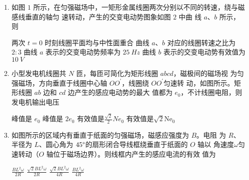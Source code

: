 \begin{enumerate}
\item 
{}
如图 $ 1 $ 所示，在匀强磁场中，一矩形金属线圈两次分别以不同的转速，绕与磁感线垂直的轴匀
速转动，产生的交变电动势图象如图 $ 2 $ 中曲
线 $ a $、$ b $ 所示，则  
\begin{figure}[h!]
\centering
\begin{subfigure}{0.4\linewidth}
\centering
 
\caption{}\label{}
\end{subfigure}
\begin{subfigure}{0.4\linewidth}
\centering
 
\caption{}\label{}
\end{subfigure}
\end{figure}



\fourchoices
{两次 $ t=0 $ 时刻线圈平面均与中性面重合}
{曲线 $ a $、$ b $ 对应的线圈转速之比为 $ 2:3 $}
{曲线 $ a $ 表示的交变电动势频率为 $ 25 \ Hz $}
{曲线 $ b $ 表示的交变电动势有效值为 $ 10 \ V $}


\item 
{}
小型发电机线圈共 $ N $ 匝，每匝可简化为矩形线圈 $ abcd $，磁极间的磁场视
为匀强磁场，方向垂直于线圈中心轴 $ OO ^{\prime} $，线圈绕 $ OO ^{\prime} $匀速转
动，如图所示。矩形线圈 $ ab $ 边和 $ cd $ 边产生的感应电动势的最大
值都为 $ e_{0} $，不计线圈电阻，则发电机输出电压  
\begin{figure}[h!]
\centering

\end{figure}

\fourchoices
{峰值是 $ e_{0} $}
{峰值是 $ 2e_{0} $}
{有效值是$\frac{\sqrt{2}}{2} N e_{0}$}
{有效值是$\sqrt{2} \mathrm{Ne}_{0}$}


\item 
{}
如图所示的区域内有垂直于纸面的匀强磁场，磁感应强度为 $ B $。电阻
为 $ R $、半径为 $ L $、圆心角为 $ 45 \degree $的扇形闭合导线框绕垂直于纸面的 $ O $ 轴以
角速度$ \omega $匀速转动（$ O $ 轴位于磁场边界）。则线框内产生的感应电流的有效
值为  
\begin{figure}[h!]
\centering

\end{figure}


\fourchoices
{$\frac{B L^{2} \omega}{2 R}$}
{$\frac{\sqrt{2} B L^{2} \omega}{2 R}$}
{$\frac{\sqrt{2} B L^{2} \omega}{4 R}$}
{$\frac{B L^{2} \omega}{4 R}$}




\end{enumerate}
